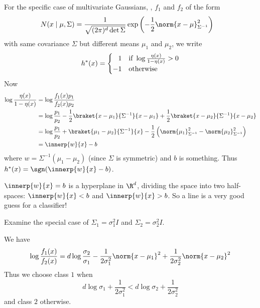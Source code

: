 For the specific case of multivariate Gaussians, \ie, $f_1$ and $f_2$ of the
form \begin{align*}
    N(x \mid \mu, \Sigma) &= \frac{1}{\sqrt{(2\pi)^d \det \Sigma}}
        \exp\left(-\frac{1}{2} \norm{x - \mu}^2_{\Sigma^{-1}}\right)
\end{align*} with same covariance $\Sigma$ but different means $\mu_1$ and $\mu_2$,
we write \[
    h^*(x) = \begin{cases}
        \hphantom{-}1 & \text{if } \log \frac{\eta(x)}{1 - \eta(x)} > 0 \\
        -1 & \text{otherwise}
    \end{cases}
\] Now \begin{align*}
    \log \frac{\eta(x)}{1 - \eta(x)}
        &= \log \frac{f_1(x) p_1}{f_2(x) p_2} \\
        &= \log \frac{p_1}{p_2} - \frac12 \braket{x - \mu_1}{\Sigma^{-1}}{x - \mu_1}
            + \frac12 \braket{x - \mu_2}{\Sigma^{-1}}{x - \mu_2} \\
        &= \log \frac{p_1}{p_2} + \braket{\mu_1 - \mu_2}{\Sigma^{-1}}{x}
            - \frac12 \left(\norm{\mu_1}^2_{\Sigma^{-1}} - \norm{\mu_2}^2_{\Sigma^{-1}}\right) \\
        &= \innerp{w}{x} - b
\end{align*} where $w = \Sigma^{-1}(\mu_1 - \mu_2)$ (since $\Sigma$ is symmetric) and
$b$ is something.
Thus $h^*(x) = \sgn(\innerp{w}{x} - b)$.
\begin{remark}
    $\innerp{w}{x} = b$ is a hyperplane in $\R^d$, dividing the space into two
    half-spaces: $\innerp{w}{x} < b$ and $\innerp{w}{x} > b$.
    So a line is a very good guess for a classifier!
\end{remark}

\begin{exercise}
    Examine the special case of $\Sigma_1 = \sigma_1^2 I$ and
    $\Sigma_2 = \sigma_2^2 I$.
\end{exercise}
\begin{solution}
    We have \begin{equation*}
        \log \frac{f_1(x)}{f_2(x)}
            = d \log \frac{\sigma_2}{\sigma_1}
                - \frac{1}{2\sigma_1^2} \norm{x - \mu_1}^2
                + \frac{1}{2\sigma_2^2} \norm{x - \mu_2}^2
    \end{equation*}
    Thus we choose class $1$ when \[
        d \log \sigma_1 + \frac{1}{2\sigma_1^2}
            < d \log \sigma_2 + \frac{1}{2\sigma_2^2}
    \] and class $2$ otherwise.
\end{solution}

